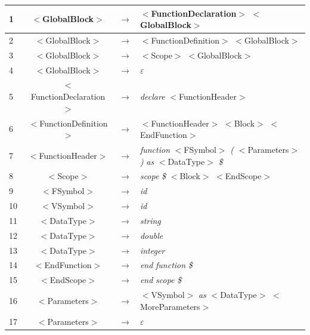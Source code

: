 \documentclass[10pt,a4paper,titlepage]{article}
\begin{document}
{\scriptsize
  \begin{center}
    \begin{tabular}{ | l | c  c  l | } \hline
      1  & $<$GlobalBlock$>$              & $\rightarrow$ & $<$FunctionDeclaration$>$ $<$GlobalBlock$>$ \\ \hline
      2  & $<$GlobalBlock$>$              & $\rightarrow$ & $<$FunctionDefinition$>$ $<$GlobalBlock$>$ \\ \hline
      3  & $<$GlobalBlock$>$              & $\rightarrow$ & $<$Scope$>$ $<$GlobalBlock$>$ \\ \hline
      4  & $<$GlobalBlock$>$              & $\rightarrow$ & $\varepsilon$ \\ \hline
      5  & $<$FunctionDeclaration$>$      & $\rightarrow$ & {\it declare} $<$FunctionHeader$>$ \\ \hline
      6  & $<$FunctionDefinition$>$       & $\rightarrow$ & $<$FunctionHeader$>$ $<$Block$>$ $<$EndFunction$>$ \\ \hline
      7  & $<$FunctionHeader$>$           & $\rightarrow$ & {\it function} $<$FSymbol$>$ {\it (} $<$Parameters$>$ {\it )} {\it as} $<$DataType$>$ {\it \$} \\ \hline
      8  & $<$Scope$>$                    & $\rightarrow$ & {\it scope} {\it \$} $<$Block$>$ $<$EndScope$>$ \\ \hline
      9  & $<$FSymbol$>$                  & $\rightarrow$ & {\it id} \\ \hline
      10 & $<$VSymbol$>$                  & $\rightarrow$ & {\it id} \\ \hline
      11 & $<$DataType$>$                 & $\rightarrow$ & {\it string} \\ \hline
      12 & $<$DataType$>$                 & $\rightarrow$ & {\it double} \\ \hline
      13 & $<$DataType$>$                 & $\rightarrow$ & {\it integer} \\ \hline
      14 & $<$EndFunction$>$              & $\rightarrow$ & {\it end} {\it function} {\it \$} \\ \hline
      15 & $<$EndScope$>$                 & $\rightarrow$ & {\it end} {\it scope} {\it \$} \\ \hline
      16 & $<$Parameters$>$               & $\rightarrow$ & $<$VSymbol$>$ {\it as} $<$DataType$>$ $<$MoreParameters$>$ \\ \hline
      17 & $<$Parameters$>$               & $\rightarrow$ & $\varepsilon$ \\ \hline

\end{tabular}
\end{center}}
\end{document}
